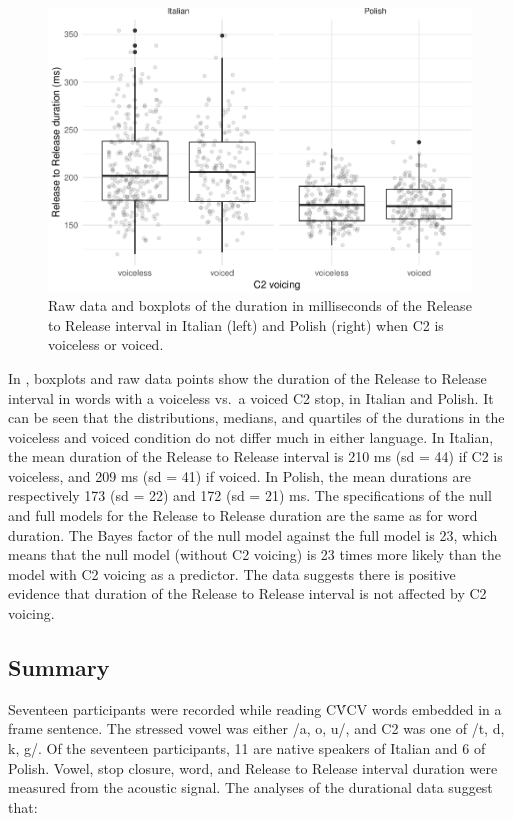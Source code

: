 \documentclass[preprint]{JASAnew}
\begin{document}
\begin{figure}
\includegraphics[width=\linewidth]{2018-jasa_files/figure-latex/rr-plot-1} \caption{Raw data and boxplots of the duration in milliseconds of the Release to Release interval in Italian (left) and Polish (right) when C2 is voiceless or voiced.}\label{f:rr-plot}
\end{figure}

In , boxplots and raw data points show the duration of
the Release to Release interval in words with a voiceless vs.~a voiced
C2 stop, in Italian and Polish. It can be seen that the distributions,
medians, and quartiles of the durations in the voiceless and voiced
condition do not differ much in either language. In Italian, the mean
duration of the Release to Release interval is 210 ms (sd = 44) if C2 is
voiceless, and 209 ms (sd = 41) if voiced. In Polish, the mean durations
are respectively 173 (sd = 22) and 172 (sd = 21) ms. The specifications
of the null and full models for the Release to Release duration are the
same as for word duration. The Bayes factor of the null model against
the full model is 23, which means that the null model (without C2
voicing) is 23 times more likely than the model with C2 voicing as a
predictor. The data suggests there is positive evidence that duration of
the Release to Release interval is not affected by C2 voicing.

\hypertarget{summary}{%
\subsection{Summary}\label{summary}}

Seventeen participants were recorded while reading CV́CV words embedded
in a frame sentence. The stressed vowel was either /a, o, u/, and C2 was
one of /t, d, k, g/. Of the seventeen participants, 11 are native
speakers of Italian and 6 of Polish. Vowel, stop closure, word, and
Release to Release interval duration were measured from the acoustic
signal. The analyses of the durational data suggest that:
\end{document}
